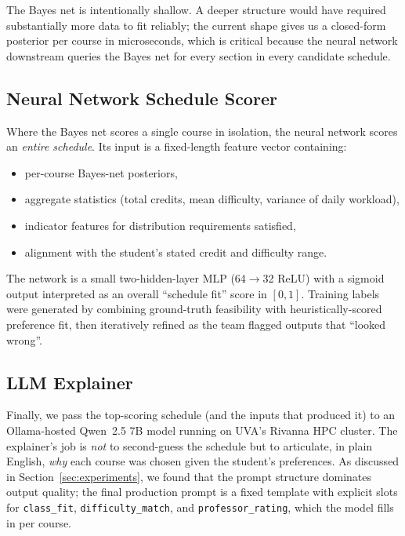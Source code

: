 \documentclass[10pt,letterpaper]{article}
\newcommand{\code}[1]{\texttt{\small #1}}
\begin{document}
The Bayes net is intentionally shallow. A deeper structure would have
required substantially more data to fit reliably; the current shape gives
us a closed-form posterior per course in microseconds, which is critical
because the neural network downstream queries the Bayes net for every
section in every candidate schedule.

\subsection{Neural Network Schedule Scorer}

Where the Bayes net scores a single course in isolation, the neural
network scores an \emph{entire schedule}. Its input is a fixed-length
feature vector containing:
\begin{itemize}[leftmargin=*,topsep=1pt,itemsep=1pt]
  \item per-course Bayes-net posteriors,
  \item aggregate statistics (total credits, mean difficulty, variance of
    daily workload),
  \item indicator features for distribution requirements satisfied,
  \item alignment with the student's stated credit and difficulty range.
\end{itemize}
The network is a small two-hidden-layer MLP (64$\to$32 ReLU) with a sigmoid
output interpreted as an overall ``schedule fit'' score in $[0,1]$. Training
labels were generated by combining ground-truth feasibility with
heuristically-scored preference fit, then iteratively refined as the team
flagged outputs that ``looked wrong''.

\subsection{LLM Explainer}

Finally, we pass the top-scoring schedule (and the inputs that produced it)
to an Ollama-hosted Qwen~2.5 7B model running on UVA's Rivanna HPC cluster.
The explainer's job is \emph{not} to second-guess the schedule but to
articulate, in plain English, \emph{why} each course was chosen given the
student's preferences. As discussed in Section~\ref{sec:experiments}, we
found that the prompt structure dominates output quality; the final
production prompt is a fixed template with explicit slots for
\code{class\_fit}, \code{difficulty\_match}, and
\code{professor\_rating}, which the model fills in per course.
\end{document}
